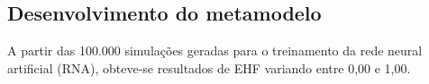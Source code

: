 \documentclass[brazil,hardcopy,openany,a4paper]{ufscthesis}
\begin{document}
%	

	\subsection{Desenvolvimento do metamodelo}
	
	A partir das 100.000 simulações geradas para o treinamento da rede neural artificial (RNA), obteve-se resultados de EHF variando entre 0,00 e 1,00.
	
\end{document}
